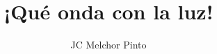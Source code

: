 \documentclass[12pt,addpoints,answers]{guia}
\title{¡Qué onda con la luz!}
\author{JC Melchor Pinto}
\begin{document}
\INFO%
%
\begin{questions}
    \questionboxed[25]{}
\end{questions}
\end{document}
